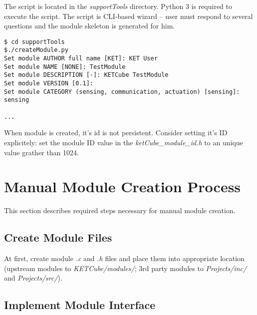 The script is located in the {\it supportTools} directory. Python 3 is required to execute the script. 
The script is CLI-based wizard -- user must respond to several questions and the module skeleton is generated for him.

\begin{docCodeExample}
\begin{verbatim}
$ cd supportTools
$./createModule.py
Set module AUTHOR full name [KET]: KET User
Set module NAME [NONE]: TestModule
Set module DESCRIPTION [-]: KETCube TestModule
Set module VERSION [0.1]: 
Set module CATEGORY (sensing, communication, actuation) [sensing]: sensing

...
\end{verbatim}
\end{docCodeExample}

When module is created, it's id is not persistent. Consider setting it's ID explicitely: set the module ID value in the {\it ketCube\_module\_id.h} to an unique value grather than 1024.





\clearpage
\section{Manual Module Creation Process}
This section describes required steps necessary for manual module creation.

\subsection*{Create Module Files}

At first, create module {\it .c} and {\it .h} files and place them into appropriate location (upstream modules to {\it KETCube/modules/}; 3rd party modules to {\it Projects/inc/} and {\it Projects/src/}).



\subsection*{Implement Module Interface}
